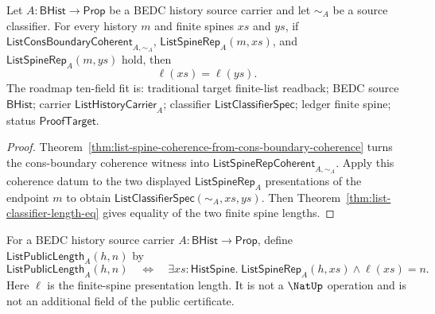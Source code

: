 \begin{theorem}
\label{thm:list-spine-cons-boundary-length-deterministic}
Let $A:\mathsf{BHist}\to\mathsf{Prop}$ be a BEDC history source carrier and let
$\sim_A$ be a source classifier. For every history $m$ and finite spines $xs$
and $ys$, if $\mathsf{ListConsBoundaryCoherent}_{A,\sim_A}$,
$\mathsf{ListSpineRep}_A(m,xs)$, and $\mathsf{ListSpineRep}_A(m,ys)$ hold, then
$$
\ell(xs)=\ell(ys).
$$
The roadmap ten-field fit is: traditional target finite-list readback; BEDC source $\mathsf{BHist}$; carrier $\mathsf{ListHistoryCarrier}_A$; classifier $\mathsf{ListClassifierSpec}$; ledger finite spine; status $\mathsf{ProofTarget}$.
\end{theorem}
\begin{proof}
Theorem~\ref{thm:list-spine-coherence-from-cons-boundary-coherence} turns the
cons-boundary coherence witness into
$\mathsf{ListSpineRepCoherent}_{A,\sim_A}$. Apply this coherence datum to the
two displayed $\mathsf{ListSpineRep}_A$ presentations of the endpoint $m$ to
obtain $\mathsf{ListClassifierSpec}(\sim_A,xs,ys)$. Then
Theorem~\ref{thm:list-classifier-length-eq} gives equality of the two finite
spine lengths.
\end{proof}

\begin{definition}
\label{def:list-public-length-readback}
For a BEDC history source carrier $A:\mathsf{BHist}\to\mathsf{Prop}$, define
$\mathsf{ListPublicLength}_A(h,n)$ by
$$
\mathsf{ListPublicLength}_A(h,n)
\quad\Longleftrightarrow\quad
\exists xs:\mathsf{HistSpine}.\;
\mathsf{ListSpineRep}_A(h,xs)\land \ell(xs)=n.
$$
Here $\ell$ is the finite-spine presentation length. It is not a $\NatUp$
operation and is not an additional field of the public certificate.
\end{definition}

